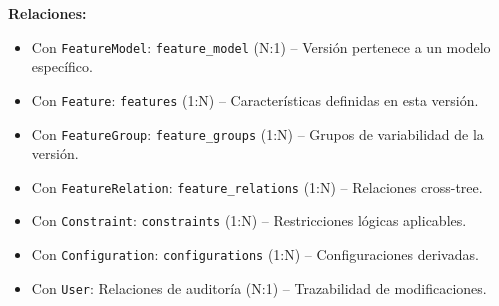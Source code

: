 {{{            \textbf{Relaciones:}
            \begin{itemize}
                \item Con \texttt{FeatureModel}: \texttt{feature\_model} (N:1) -- Versión pertenece a un modelo específico.
                \item Con \texttt{Feature}: \texttt{features} (1:N) -- Características definidas en esta versión.
                \item Con \texttt{FeatureGroup}: \texttt{feature\_groups} (1:N) -- Grupos de variabilidad de la versión.
                \item Con \texttt{FeatureRelation}: \texttt{feature\_relations} (1:N) -- Relaciones cross-tree.
                \item Con \texttt{Constraint}: \texttt{constraints} (1:N) -- Restricciones lógicas aplicables.
                \item Con \texttt{Configuration}: \texttt{configurations} (1:N) -- Configuraciones derivadas.
                \item Con \texttt{User}: Relaciones de auditoría (N:1) -- Trazabilidad de modificaciones.
            \end{itemize}

        }
        }}
